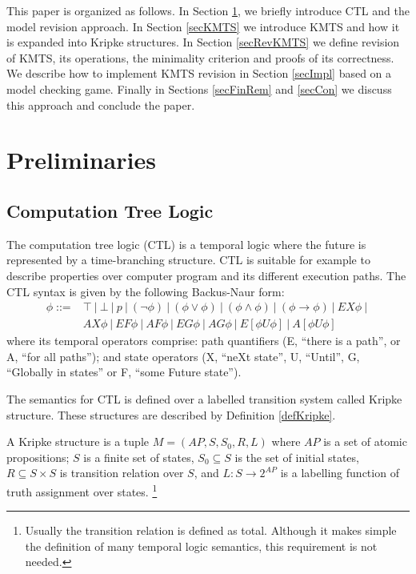 \documentclass{llncs}
\begin{document}
This paper is organized as follows. In Section \ref{secMedRepPro}, we briefly introduce CTL and the model revision approach. In Section \ref{secKMTS} we introduce KMTS and how it is expanded into Kripke structures. In Section \ref{secRevKMTS} we define revision of KMTS, its operations, the minimality criterion and proofs of its correctness. We describe how to implement KMTS revision in Section \ref{secImpl} based on a model checking game.  Finally in Sections \ref{secFinRem} and \ref{secCon} we discuss this approach and conclude the paper.


\section{Preliminaries} \label{secMedRepPro}


\subsection{Computation Tree Logic}

The computation tree logic (CTL) \cite{CE81,CES86} is a temporal logic where the future is represented by a time-branching structure. CTL is suitable for example to describe properties over computer program and its different execution paths. The CTL syntax is given by the following Backus-Naur form:
	\begin{align*} 
		\phi \mathop{::=}& \top ~|~ \bot ~|~ p ~|~ (\neg \phi) ~|~ (\phi \vee \phi) ~|~
					(\phi \wedge \phi) ~|~ (\phi \rightarrow \phi) ~|~ EX{\phi} ~|~ \\			
				&	AX{\phi} ~|~  EF{\phi} ~|~ AF{\phi} ~|~ EG{\phi} ~|~ AG{\phi} ~|~ 
					E[{\phi}U{\phi}] ~|~ A[{\phi}U{\phi}] 
	\end{align*}
where its temporal operators comprise: path quantifiers (E, ``there is a path'', or A, ``for all paths''); and state operators (X, ``neXt state'', U, ``Until'', G, ``Globally in states'' or F, ``some Future state'').

The semantics for CTL is defined over a labelled transition system called Kripke structure. These structures are described by Definition \ref{defKripke}.

\begin{definition}\label{defKripke}
A Kripke structure is a tuple $ M = (AP,S,S_0,R,L) $ where $AP$ is a set of atomic propositions;
$S$ is a finite set of states,
$S_0 \subseteq S$ is the set of initial states,
$R \subseteq S \times S$ is transition relation over $S$, and
$L: S \rightarrow 2^{AP}$ is a labelling function of truth assignment over states.
\footnote{Usually the transition relation is defined as total. Although it makes simple the definition of many temporal logic semantics, this requirement is not needed.}
\end{definition}
\end{document}
